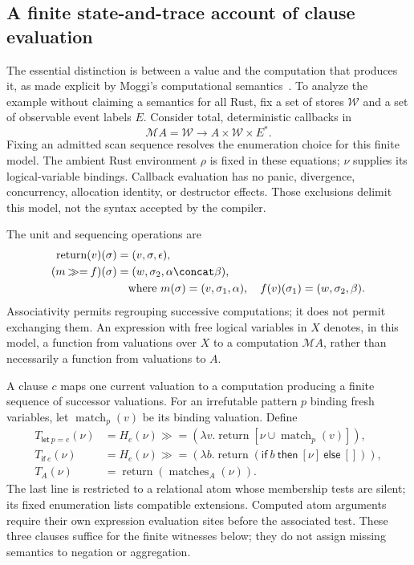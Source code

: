 \subsection{A finite state-and-trace account of clause evaluation}
\label{sec:effect-sequencing}
The essential distinction is between a value and the computation that produces
it, as made explicit by Moggi's computational semantics~\cite{prov-moggi}.
To analyze the example without claiming a semantics for all Rust, fix a set
of stores $\mathcal W$ and a set of observable event labels $E$. Consider
total, deterministic callbacks in
\[
 \mathcal M A=\mathcal W\longrightarrow A\times\mathcal W\times E^*.
\]
Fixing an admitted scan sequence resolves the enumeration choice for this
finite model. The ambient Rust environment $\rho$ is fixed in these equations;
$\nu$ supplies its logical-variable bindings. Callback evaluation has no panic, divergence, concurrency,
allocation identity, or destructor effects. Those exclusions delimit this
model, not the syntax accepted by the compiler.

The unit and sequencing operations are
\[
\begin{aligned}
 \operatorname{return}(v)(\sigma)&=(v,\sigma,\epsilon),\\
 (m\mathbin{\gg=} f)(\sigma)&=(w,\sigma_2,\alpha\concat\beta),\\
 &\quad\text{where }m(\sigma)=(v,\sigma_1,\alpha),\quad
 f(v)(\sigma_1)=(w,\sigma_2,\beta).
\end{aligned}
\]
Associativity permits regrouping successive computations; it does not permit
exchanging them. An expression with free logical variables in $X$ denotes,
in this model, a function from valuations over $X$ to a computation
$\mathcal M A$, rather than necessarily a function from valuations to $A$.

A clause $c$ maps one current valuation to a computation producing a finite
sequence of successor valuations. For an irrefutable pattern $p$ binding fresh
variables, let $\operatorname{match}_p(v)$ be its binding valuation. Define
\[
\begin{aligned}
 T_{\mathsf{let}\ p=e}(\nu)
   &= H_e(\nu)\mathbin{\gg=}
       (\lambda v.\operatorname{return}[\nu\cup\operatorname{match}_p(v)]),\\
 T_{\mathsf{if}\ e}(\nu)
   &= H_e(\nu)\mathbin{\gg=}
       (\lambda b.\operatorname{return}(\mathsf{if}\ b\
          \mathsf{then}\ [\nu]\ \mathsf{else}\ [])),\\
 T_A(\nu)&=\operatorname{return}(\operatorname{matches}_A(\nu)).
\end{aligned}
\]
The last line is restricted to a relational atom whose membership tests are
silent; its fixed enumeration lists compatible extensions. Computed atom
arguments require their own expression evaluation sites before the associated
test. These three clauses suffice for the finite witnesses below; they do not
assign missing semantics to negation or aggregation.

